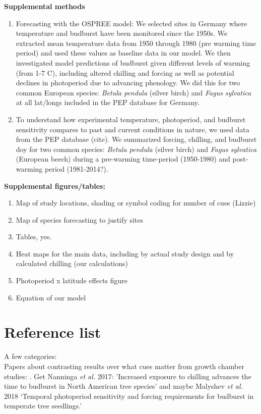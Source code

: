 \documentclass{article}
\begin{document}
{\bf Supplemental methods}
\begin{enumerate}
\item Forecasting with the OSPREE model: We selected sites in Germany where temperature and budburst have been monitored since the 1950s. We extracted mean temperature data from 1950 through 1980 (pre warming time period) and used these values as baseline data in our model. We then investigated model predictions of budburst given different levels of warming (from 1-7 \degree C), including altered chilling and forcing as well as potential declines in photoperiod due to advancing phenology. We did this for two common European species: \emph{Betula pendula} (silver birch) and \emph{Fagus sylvatica} at all lat/longs included in the PEP database for Germany. 

\item  To understand how experimental temperature, photoperiod, and budburst sensitivity compares to past and current conditions in nature, we used data from the PEP database (cite). We summarized forcing, chilling, and budburst doy for two common species: \emph{Betula pendula} (silver birch) and \emph{Fagus sylvatica} (European beech) during a pre-warming time-period (1950-1980) and post-warming period (1981-2014?). 

\end{enumerate}
{\bf Supplemental figures/tables:}
\begin{enumerate}
\item Map of study locations, shading or symbol coding for number of cues (Lizzie)
\item Map of species forecasting to justify sites
\item Tables, yes.
\item Heat maps for the main data, including by actual study design and by calculated chilling (our calculations)
\item Photoperiod x latitude effects figure
\item Equation of our model

\end{enumerate}

\section*{Reference list}

A few categories:\\

Papers about contrasting results over what cues matter from growth chamber studies: \cite{Basler:2012,Basler:2014aa,Caffarra:2011qf,Caffarra:2011a,Caffarra:2011b,Heide:2005aa,koerner2010b,Laube:2014a,vitasse2013,zohner2016}. Get Nanninga \emph{et al.} 2017: 'Increased exposure to chilling advances the time to budburst in North American tree species' and maybe Malyshev \emph{et al.} 2018 `Temporal photoperiod sensitivity and forcing requirements for budburst in temperate tree seedlings.'\\
\end{document}
